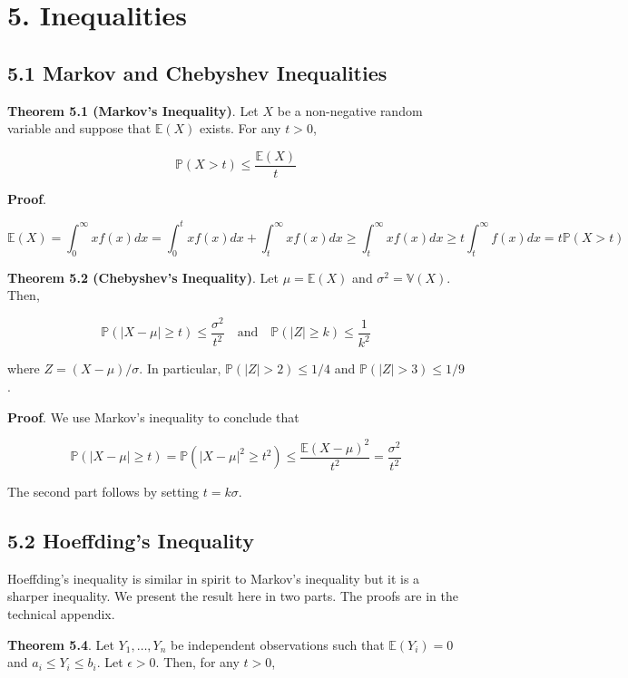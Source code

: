 \section*{5. Inequalities}\label{inequalities}

\subsection*{5.1 Markov and Chebyshev
Inequalities}\label{markov-and-chebyshev-inequalities}

\textbf{Theorem 5.1 (Markov's Inequality)}. Let \(X\) be a non-negative
random variable and suppose that \(\mathbb{E}(X)\) exists. For any
\(t > 0\),

\[ \mathbb{P}(X > t) \leq \frac{\mathbb{E}(X)}{t} \]

\textbf{Proof}.

\[ 
\mathbb{E}(X)
=\int_{0}^{\infty} xf(x) dx
=\int_{0}^t xf(x) dx + \int_t^{\infty} xf(x) dx
\geq \int_t^{\infty} xf(x) dx
\geq t \int_t^{\infty} f(x) dx
= t \mathbb{P}(X > t)
\]

\textbf{Theorem 5.2 (Chebyshev's Inequality)}. Let
\(\mu = \mathbb{E}(X)\) and \(\sigma^{2} = \mathbb{V}(X)\). Then,

\[ \mathbb{P}(|X - \mu| \geq t) \leq \frac{\sigma^{2}}{t^{2}} 
\quad \text{and} \quad
\mathbb{P}(|Z| \geq k) \leq \frac{1}{k^{2}} \]

where \(Z = (X - \mu) / \sigma\). In particular,
\(\mathbb{P}(|Z| > 2) \leq 1/4\) and \(\mathbb{P}(|Z| > 3) \leq 1/9\).

\textbf{Proof}. We use Markov's inequality to conclude that

\[ \mathbb{P}(|X - \mu| \geq t) = \mathbb{P}(|X - \mu|^{2} \geq t^{2}) \leq \frac{\mathbb{E}(X - \mu)^{2}}{t^{2}} = \frac{\sigma^{2}}{t^{2}} \]

The second part follows by setting \(t = k \sigma\).

\subsection*{5.2 Hoeffding's Inequality}\label{hoeffdings-inequality}

Hoeffding's inequality is similar in spirit to Markov's inequality but
it is a sharper inequality. We present the result here in two parts. The
proofs are in the technical appendix.

\textbf{Theorem 5.4}. Let \(Y_{1}, \dots, Y_{n}\) be independent
observations such that \(\mathbb{E}(Y_{i}) = 0\) and
\(a_{i} \leq Y_{i} \leq b_{i}\). Let \(\epsilon > 0\). Then, for any
\(t > 0\),

